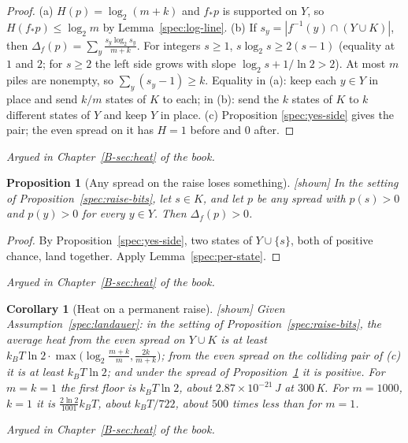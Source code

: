 \documentclass[11pt, a4paper]{article}
\theoremstyle{plain}
\newtheorem{proposition}[theorem]{Proposition}
\newtheorem{corollary}[theorem]{Corollary}
\theoremstyle{definition}
\theoremstyle{remark}
\newcommand{\inv}{^{-1}}
\newcommand{\argued}[1]{\par\noindent\textit{Argued in Chapter~\ref{B-#1} of the book.}\par}
\newcommand{\kind}[1]{\textup{[#1]}}
\begin{document}
\begin{proof}
(a) $H(p)=\log_2(m+k)$ and $f_*p$ is supported on $Y$, so $H(f_*p)\le\log_2m$ by
Lemma~\ref{spec:log-line}. (b) If $s_y=|f\inv(y)\cap(Y\cup K)|$, then
$\Delta_f(p)=\sum_y\frac{s_y\log_2 s_y}{m+k}$. For integers $s\ge1$, $s\log_2s\ge2(s-1)$ (equality at $1$ and
$2$; for $s\ge2$ the left side grows with slope $\log_2s+1/\ln2>2$). At most $m$ piles are nonempty, so
$\sum_y(s_y-1)\ge k$. Equality in (a): keep each $y\in Y$ in place and send $k/m$ states of $K$ to each; in
(b): send the $k$ states of $K$ to $k$ different states of $Y$ and keep $Y$ in place. (c) Proposition
\ref{spec:yes-side} gives the pair; the even spread on it has $H=1$ before and $0$ after.
\end{proof}

\argued{sec:heat}

\begin{proposition}[Any spread on the raise loses something]\label{spec:any-spread} \kind{shown}
In the setting of Proposition~\ref{spec:raise-bits}, let $s\in K$, and let $p$ be any spread with $p(s)>0$ and
$p(y)>0$ for every $y\in Y$. Then $\Delta_f(p)>0$.
\end{proposition}

\begin{proof}
By Proposition~\ref{spec:yes-side}, two states of $Y\cup\{s\}$, both of positive chance, land together.
Apply Lemma~\ref{spec:per-state}.
\end{proof}

\argued{sec:heat}

\begin{corollary}[Heat on a permanent raise]\label{spec:raise-heat} \kind{shown}
Given Assumption~\ref{spec:landauer}: in the setting of Proposition~\ref{spec:raise-bits}, the average heat
from the even spread on $Y\cup K$ is at least
$k_BT\ln2\cdot\max\bigl(\log_2\frac{m+k}{m},\frac{2k}{m+k}\bigr)$; from the even spread on the colliding pair
of (c) it is at least $k_BT\ln2$; and under the spread of Proposition~\ref{spec:any-spread} it is positive.
For $m=k=1$ the first floor is $k_BT\ln 2$, about $2.87\times10^{-21}$\,J at $300$\,K. For $m=1000$, $k=1$ it
is $\frac{2\ln2}{1001}k_BT$, about $k_BT/722$, about $500$ times less than for $m=1$.
\end{corollary}

\argued{sec:heat}
\end{document}
